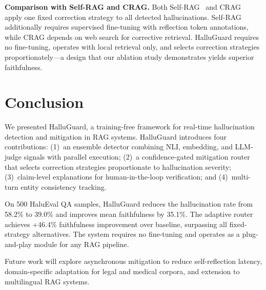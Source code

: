 \documentclass[conference]{IEEEtran}
\begin{document}
\textbf{Comparison with Self-RAG and CRAG.} Both Self-RAG~\cite{asai2024selfrag} and CRAG~\cite{yan2024crag} apply one fixed correction strategy to all detected hallucinations. Self-RAG additionally requires supervised fine-tuning with reflection token annotations, while CRAG depends on web search for corrective retrieval. HalluGuard requires no fine-tuning, operates with local retrieval only, and selects correction strategies proportionately---a design that our ablation study demonstrates yields superior faithfulness.

\section{Conclusion}

We presented HalluGuard, a training-free framework for real-time hallucination detection and mitigation in RAG systems. HalluGuard introduces four contributions: (1)~an ensemble detector combining NLI, embedding, and LLM-judge signals with parallel execution; (2)~a confidence-gated mitigation router that selects correction strategies proportionate to hallucination severity; (3)~claim-level explanations for human-in-the-loop verification; and (4)~multi-turn entity consistency tracking.

On 500 HaluEval QA samples, HalluGuard reduces the hallucination rate from 58.2\% to 39.0\% and improves mean faithfulness by 35.1\%. The adaptive router achieves +46.4\% faithfulness improvement over baseline, surpassing all fixed-strategy alternatives. The system requires no fine-tuning and operates as a plug-and-play module for any RAG pipeline.

Future work will explore asynchronous mitigation to reduce self-reflection latency, domain-specific adaptation for legal and medical corpora, and extension to multilingual RAG systems.



\end{document}
